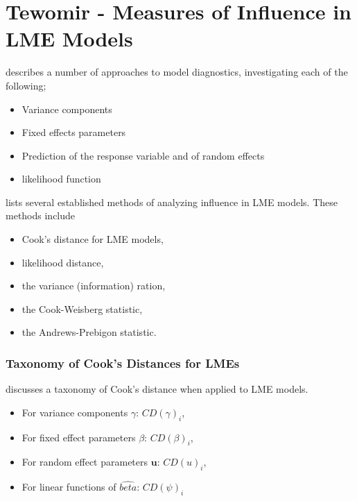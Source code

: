 \documentclass[12pt, a4paper]{article}
\begin{document}
\section{Tewomir - Measures of Influence in LME Models}%
\citet{tewomir} describes a number of approaches to model diagnostics, investigating each of the following;
\begin{itemize}
	\item Variance components
	\item Fixed effects parameters
	\item Prediction of the response variable and of random effects
	\item likelihood function
\end{itemize}

\citet{tewomir} lists several established methods of analyzing influence in LME models. These methods include \begin{itemize}
	\item Cook's distance for LME models,
	\item {} likelihood distance,
	\item the variance (information) ration,
	\item the  Cook-Weisberg statistic,
	\item the  Andrews-Prebigon statistic.
\end{itemize}



\subsubsection{Taxonomy of Cook's Distances for LMEs}
\citet{tewomir} discusses a taxonomy of Cook's distance when applied to LME models. 
\begin{itemize}
	\item For variance components $\gamma$: $CD(\gamma)_i$,
	\item For fixed effect parameters $\beta$: $CD(\beta)_i$,
	\item For random effect parameters $\boldsymbol{u}$: $CD(u)_i$,
	\item For linear functions of $\hat{beta}$: $CD(\psi)_i$
\end{itemize}			


\end{document}
